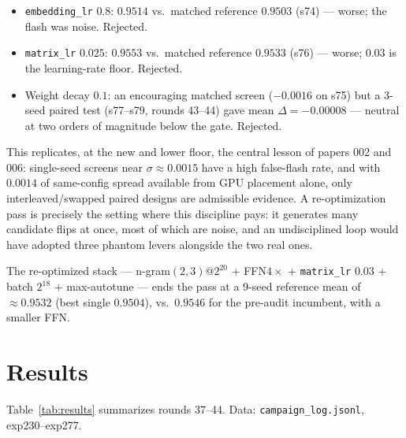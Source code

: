 \documentclass{article}
\begin{document}
\begin{itemize}
    \item \texttt{embedding\_lr} $0.8$: $0.9514$ vs.\ matched reference $0.9503$ (s74) --- worse; the flash was noise. Rejected.
    \item \texttt{matrix\_lr} $0.025$: $0.9553$ vs.\ matched reference $0.9533$ (s76) --- worse; $0.03$ is the learning-rate floor. Rejected.
    \item Weight decay $0.1$: an encouraging matched screen ($-0.0016$ on s75) but a 3-seed paired test (s77--s79, rounds 43--44) gave mean $\Delta = -0.00008$ --- neutral at two orders of magnitude below the gate. Rejected.
\end{itemize}

This replicates, at the new and lower floor, the central lesson of papers 002 and 006: single-seed screens near $\sigma \approx 0.0015$ have a high false-flash rate, and with $0.0014$ of same-config spread available from GPU placement alone, only interleaved/swapped paired designs are admissible evidence. A re-optimization pass is precisely the setting where this discipline pays: it generates many candidate flips at once, most of which are noise, and an undisciplined loop would have adopted three phantom levers alongside the two real ones.

The re-optimized stack --- n-gram$(2,3)$@$2^{20}$ + FFN$4\times$ + \texttt{matrix\_lr} $0.03$ + batch $2^{18}$ + max-autotune --- ends the pass at a 9-seed reference mean of $\approx 0.9532$ (best single $0.9504$), vs.\ $0.9546$ for the pre-audit incumbent, with a smaller FFN.

\section{Results}
\label{sec:results}

Table~\ref{tab:results} summarizes rounds 37--44. Data: \texttt{campaign\_log.jsonl}, exp230--exp277.
\end{document}
